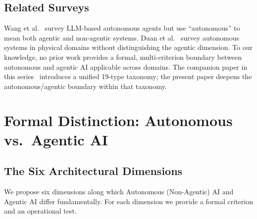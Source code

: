 \documentclass[12pt, a4paper]{article}
\begin{document}
\subsection{Related Surveys}
Wang et al.~\citep{wang2024survey} survey LLM-based autonomous agents but use ``autonomous'' to mean both agentic and non-agentic systems. Duan et al.~\citep{duan2022survey} survey autonomous systems in physical domains without distinguishing the agentic dimension. To our knowledge, no prior work provides a formal, multi-criterion boundary between autonomous and agentic AI applicable across domains. The companion paper in this series~\citep{mahdi2026taxonomy} introduces a unified 19-type taxonomy; the present paper deepens the autonomous/agentic boundary within that taxonomy.

\section{Formal Distinction: Autonomous vs.\ Agentic AI}\label{sec:distinction}

\subsection{The Six Architectural Dimensions}

We propose six dimensions along which Autonomous (Non-Agentic) AI and Agentic AI differ fundamentally. For each dimension we provide a formal criterion and an operational test.
\end{document}
